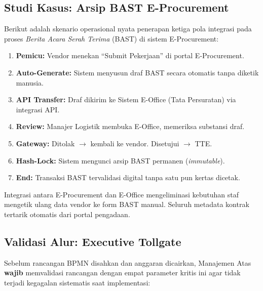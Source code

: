 \documentclass[11pt,a4paper]{article}
\begin{document}
\subsection{Studi Kasus: Arsip BAST E-Procurement}
Berikut adalah skenario operasional nyata penerapan ketiga pola integrasi pada proses \textit{Berita Acara Serah Terima} (BAST) di sistem E-Procurement:

\begin{enumerate}
    \item \textbf{Pemicu:} Vendor menekan ``Submit Pekerjaan'' di portal E-Procurement.
    \item \textbf{Auto-Generate:} Sistem menyusun draf BAST secara otomatis tanpa diketik manusia.
    \item \textbf{API Transfer:} Draf dikirim ke Sistem E-Office (Tata Persuratan) via integrasi API.
    \item \textbf{Review:} Manajer Logistik membuka E-Office, memeriksa substansi draf.
    \item \textbf{Gateway:} Ditolak $\rightarrow$ kembali ke vendor. Disetujui $\rightarrow$ TTE.
    \item \textbf{Hash-Lock:} Sistem mengunci arsip BAST permanen (\textit{immutable}).
    \item \textbf{End:} Transaksi BAST tervalidasi digital tanpa satu pun kertas dicetak.
\end{enumerate}

\begin{notesbox}
Integrasi antara E-Procurement dan E-Office mengeliminasi kebutuhan staf mengetik ulang data vendor ke form BAST manual. Seluruh metadata kontrak tertarik otomatis dari portal pengadaan.
\end{notesbox}

\subsection{Validasi Alur: Executive Tollgate}
Sebelum rancangan BPMN disahkan dan anggaran dicairkan, Manajemen Atas \textbf{wajib} memvalidasi rancangan dengan empat parameter kritis ini agar tidak terjadi kegagalan sistematis saat implementasi:
\end{document}
